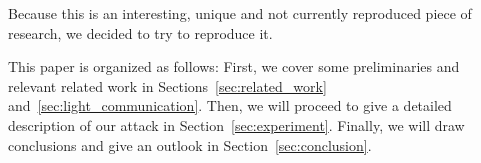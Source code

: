 Because this is an interesting, unique and not currently reproduced piece of research, we decided to try to reproduce it.

This paper is organized as follows: First, we cover some preliminaries and relevant related work in Sections~\ref{sec:related_work} and~\ref{sec:light_communication}.
Then, we will proceed to give a detailed description of our attack in Section~\ref{sec:experiment}.
Finally, we will draw conclusions and give an outlook in Section~\ref{sec:conclusion}.

